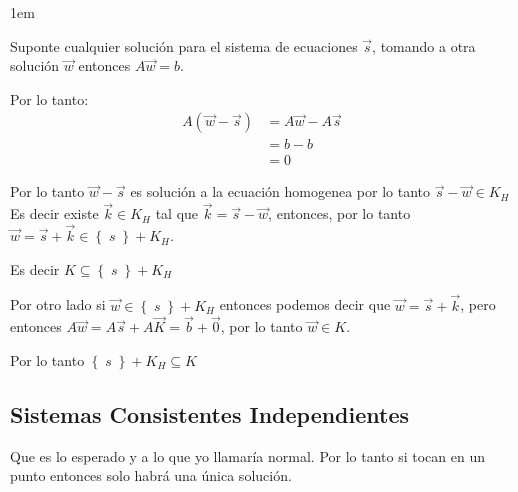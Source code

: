 \documentclass[12pt, fleqn]{report}                             %
\newenvironment{SmallIndentation}[1][0.75em]                    %
        {\begin{adjustwidth}{#1}{}\begin{footnotesize}}             %
        {\end{footnotesize}\end{adjustwidth}}                       %
\theoremstyle{break}                                            %
\newcommand{\Set}[1]    {\left\{ \; #1 \; \right\}}             %
\begin{document}
\begin{itemize}
\begin{SmallIndentation}[1em]
                                Suponte cualquier solución para el sistema de ecuaciones $\vec s$, tomando a otra solución $\vec w$
                                entonces $A\vec w = b$.

                                Por lo tanto:
                                \begin{align*}
                                    A (\vec w - \vec s)
                                        &= A \vec w - A \vec s      \\
                                        &= b - b                    \\
                                        &= 0
                                \end{align*}

                                Por lo tanto $\vec w - \vec s$ es solución a la ecuación homogenea por lo tanto $\vec s - \vec w \in K_H$
                                Es decir existe $\vec k \in K_H$ tal que $\vec k = \vec s - \vec w$, entonces, por lo
                                tanto $\vec w = \vec s + \vec k \in \Set{s} + K_H$.

                                Es decir $K \subseteq \Set{s} + K_H$

                                Por otro lado si $\vec w \in \Set{s} + K_H$ entonces podemos decir que $\vec w = \vec s + \vec k$,
                                pero entonces $A\vec w = A\vec s + A \vec K = \vec b + \vec 0$, por lo tanto $\vec w \in K$.

                                Por lo tanto $\Set{s} + K_H \subseteq K$

                            \end{SmallIndentation}
                                
                                

                    \end{itemize}

            \clearpage
            \subsection{Sistemas Consistentes Independientes}

                Que es lo esperado y a lo que yo llamaría normal.
                Por lo tanto si tocan en un punto entonces solo habrá una única solución.
\end{document}
